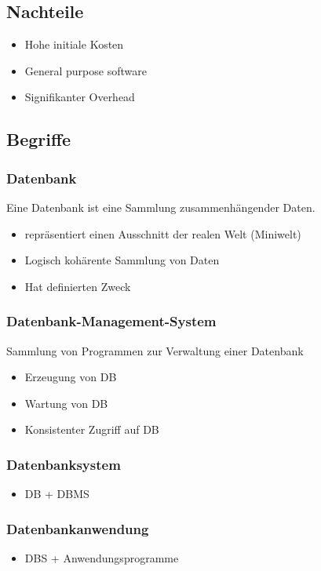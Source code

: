 \subsection{Nachteile}
\begin{itemize}
	\item Hohe initiale Kosten 
	\item General purpose software
	\item Signifikanter Overhead
\end{itemize}

\subsection{Begriffe}
\subsubsection{Datenbank}
Eine Datenbank ist eine Sammlung zusammenhängender Daten.
\begin{itemize}
	\item repräsentiert einen Ausschnitt der realen Welt (Miniwelt)
	\item Logisch kohärente Sammlung von Daten
	\item Hat definierten Zweck
\end{itemize}
\subsubsection{Datenbank-Management-System}
Sammlung von Programmen zur Verwaltung einer Datenbank
\begin{itemize}
	\item Erzeugung von DB
	\item Wartung von DB
	\item Konsistenter Zugriff auf DB
\end{itemize}
\subsubsection{Datenbanksystem}
\begin{itemize}
	\item DB + DBMS
\end{itemize}
\subsubsection{Datenbankanwendung}
\begin{itemize}
	\item DBS + Anwendungsprogramme
\end{itemize}
